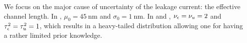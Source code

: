 We focus on the major cause of uncertainty of the leakage current: the effective channel length. In , $\mu_0 = 45~\text{nm}$ and $\sigma_0 = 1~\text{nm}$. In  and , $\nu_\epsilon = \nu_u = 2$ and $\tau^2_\epsilon = \tau^2_u = 1$, which results in a heavy-tailed distribution allowing one for having a rather limited prior knowledge.
